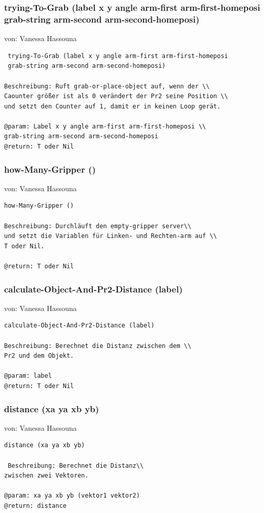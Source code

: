\documentclass{suturo}
\makeatletter
\newcommand{\chapterauthor}[1]{%
  {\parindent0pt\vspace*{-27pt}%
  \linespread{0}\small\begin{flushright}von: #1\end{flushright}%
  \par\nobreak\vspace*{0pt}}
  \@afterheading%
}
\makeatother
\begin{document}
\subsubsection{ trying-To-Grab (label x y angle arm-first arm-first-homeposi \\
grab-string arm-second arm-second-homeposi)}
\chapterauthor{Vanessa Hassouna}
\begin{verbatim} 
 trying-To-Grab (label x y angle arm-first arm-first-homeposi
 grab-string arm-second arm-second-homeposi)

Beschreibung: Ruft grab-or-place-object auf, wenn der \\
Caounter größer ist als 0 verändert der Pr2 seine Position \\
und setzt den Counter auf 1, damit er in keinen Loop gerät.

@param: Label x y angle arm-first arm-first-homeposi \\
grab-string arm-second arm-second-homeposi
@return: T oder Nil
\end{verbatim}

\subsubsection{how-Many-Gripper ()}
\chapterauthor{Vanessa Hassouna}
\begin{verbatim} 
how-Many-Gripper ()

Beschreibung: Durchläuft den empty-gripper server\\
und setzt die Variablen für Linken- und Rechten-arm auf \\
T oder Nil.

@return: T oder Nil
\end{verbatim}


\subsubsection{calculate-Object-And-Pr2-Distance (label)}
\chapterauthor{Vanessa Hassouna}
\begin{verbatim} 
calculate-Object-And-Pr2-Distance (label)

Beschreibung: Berechnet die Distanz zwischen dem \\
Pr2 und dem Objekt.

@param: label
@return: T oder Nil
\end{verbatim}


\subsubsection{distance (xa ya xb yb)}
\chapterauthor{Vanessa Hassouna}
\begin{verbatim}
distance (xa ya xb yb)

 Beschreibung: Berechnet die Distanz\\
zwischen zwei Vektoren.

@param: xa ya xb yb (vektor1 vektor2)
@return: distance
\end{verbatim}
\end{document}
